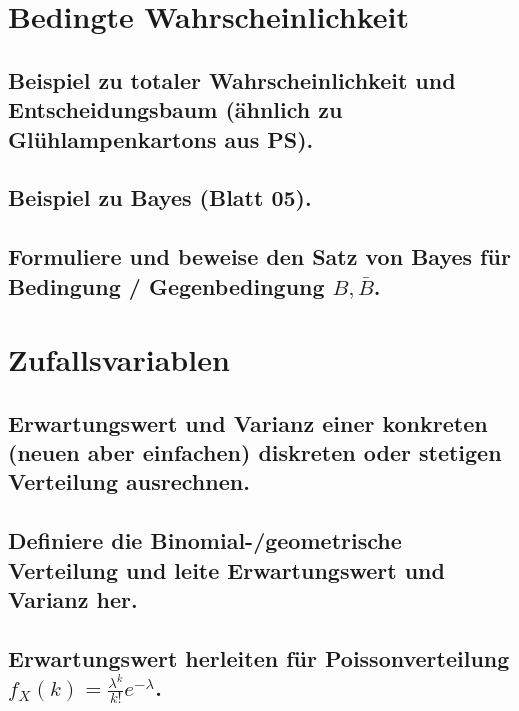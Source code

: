 \documentclass[a4paper,10pt]{article}
\begin{document}
\subsection{}

\newpage
\section{Bedingte Wahrscheinlichkeit}
\subsection{Bei\-spiel zu totaler Wahrschein\-lich\-keit und Entscheidungs\-baum (ähnlich zu Glüh\-lampen\-kartons aus PS).}

\subsection{Beispiel zu Bayes (Blatt 05).}

\subsection{Formuliere und beweise den Satz von Bayes für Bedingung / Gegenbedingung $B, \bar{B}$.}

\newpage
\section{Zufallsvariablen}
\subsection{Erwartungswert und Varianz einer konkreten (neuen aber einfachen) diskreten oder stetigen Verteilung ausrechnen.}

\subsection{Definiere die Binomial-/geometrische Verteilung und leite Erwartungswert und Varianz her.}

\subsection{Erwartungswert herleiten für Poisson\-verteilung \\ $f_X (k)=\frac{\lambda^k}{k!}e^{-\lambda}$.}
\end{document}
